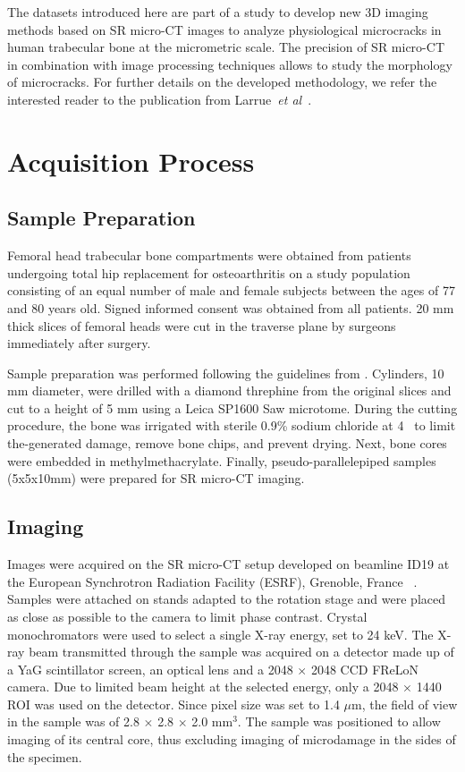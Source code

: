 \documentclass{InsightArticle}
\begin{document}
The datasets introduced here are part of a study to develop new 3D imaging
methods based on SR micro-CT images to analyze physiological microcracks in
human trabecular bone at the micrometric scale. The precision of SR micro-CT
in combination with image processing techniques allows to study the morphology
of microcracks. For further details on the developed methodology, we refer the
interested reader to the publication from Larrue~\textit{et al}~\cite{Larrue2011}.

\section{Acquisition Process}
\subsection{Sample Preparation}
Femoral head trabecular bone compartments were obtained from patients undergoing
total hip replacement for osteoarthritis on a study population consisting of
an equal number of male and female subjects between the ages of 77 and 80 years
old. Signed informed consent was obtained from all patients. 20 mm thick slices
of femoral heads were cut in the traverse plane by surgeons immediately after
surgery.

Sample preparation was performed following the guidelines from \cite{Davies2006}.
Cylinders, 10 mm diameter, were drilled with a diamond threphine from the original
slices and cut to a height of 5 mm using a Leica SP1600 Saw microtome. During the
cutting procedure, the bone was irrigated with sterile 0.9\% sodium chloride at
4\textcelsius\verb+ + %
to limit the-generated damage, remove bone chips, and prevent drying.
Next, bone cores were embedded in methylmethacrylate. Finally, pseudo-parallelepiped
samples (5x5x10mm) were prepared for SR micro-CT imaging.

\subsection{Imaging}
Images were acquired on the SR micro-CT setup developed on beamline ID19 at
the European Synchrotron Radiation Facility (ESRF), Grenoble, France~
\cite{Weitkamp2010}.
Samples were attached on stands adapted to the rotation stage and were placed as
close as possible to the camera to limit phase contrast. Crystal monochromators
were used to select a single X-ray energy, set to 24 keV. The X-ray beam
transmitted through the sample was acquired on a detector made up of a YaG
scintillator screen, an optical lens and a 2048 $\times$ 2048 CCD FReLoN camera.
Due to limited beam height at the selected energy, only a 2048 $\times$ 1440 ROI
was used on the detector. Since pixel size was set to 1.4  $\mu$m, the field of
view in the sample was of 2.8 $\times$ 2.8 $\times$ 2.0 mm$^3$. The sample was
positioned to allow imaging of its central core, thus excluding imaging of
microdamage in the sides of the specimen.
\end{document}
